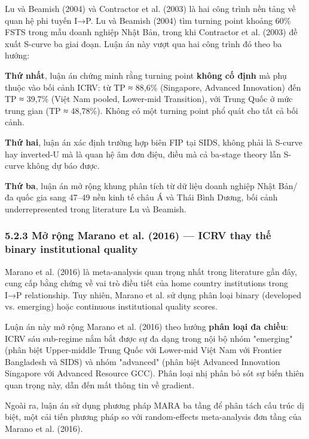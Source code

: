 \documentclass[12pt,a4paper]{article}
\begin{document}
Lu và Beamish (2004) và Contractor et al. (2003) là hai công trình nền
tảng về quan hệ phi tuyến I→P. Lu và Beamish (2004) tìm turning point
khoảng 60\% FSTS trong mẫu doanh nghiệp Nhật Bản, trong khi Contractor
et al. (2003) đề xuất S-curve ba giai đoạn. Luận án này vượt qua hai
công trình đó theo ba hướng:

\textbf{Thứ nhất}, luận án chứng minh rằng turning point \textbf{không
cố định} mà phụ thuộc vào bối cảnh ICRV: từ TP ≈ 88,6\% (Singapore,
Advanced Innovation) đến TP ≈ 39,7\% (Việt Nam pooled, Lower-mid
Transition), với Trung Quốc ở mức trung gian (TP ≈ 48,78\%). Không có
một turning point phổ quát cho tất cả bối cảnh.

\textbf{Thứ hai}, luận án xác định trường hợp biên FIP tại SIDS, không
phải là S-curve hay inverted-U mà là quan hệ âm đơn điệu, điều mà cả
ba-stage theory lẫn S-curve không dự báo được.

\textbf{Thứ ba}, luận án mở rộng khung phân tích từ dữ liệu doanh nghiệp
Nhật Bản/đa quốc gia sang 47--49 nền kinh tế châu Á và Thái Bình Dương,
bối cảnh underrepresented trong literature Lu và Beamish.

\hypertarget{523-mux1edf-rux1ed9ng-marano-et-al-2016--icrv-thay-thux1ebf-binary-institutional-quality}{%
\subsubsection{5.2.3 Mở rộng Marano et al. (2016) --- ICRV thay thế
binary institutional
quality}\label{523-mux1edf-rux1ed9ng-marano-et-al-2016--icrv-thay-thux1ebf-binary-institutional-quality}}

Marano et al. (2016) là meta-analysis quan trọng nhất trong literature
gần đây, cung cấp bằng chứng về vai trò điều tiết của home country
institutions trong I→P relationship. Tuy nhiên, Marano et al. sử dụng
phân loại binary (developed vs. emerging) hoặc continuous institutional
quality scores.

Luận án này mở rộng Marano et al. (2016) theo hướng \textbf{phân loại đa
chiều}: ICRV sáu sub-regime nắm bắt được sự đa dạng trong nội bộ nhóm
"emerging" (phân biệt Upper-middle Trung Quốc với Lower-mid Việt Nam với
Frontier Bangladesh và SIDS) và nhóm "advanced" (phân biệt Advanced
Innovation Singapore với Advanced Resource GCC). Phân loại nhị phân bỏ
sót sự biến thiên quan trọng này, dẫn đến mất thông tin về gradient.

Ngoài ra, luận án sử dụng phương pháp MARA ba tầng để phân tách cấu trúc
dị biệt, một cải tiến phương pháp so với random-effects meta-analysis
đơn tầng của Marano et al. (2016).
\end{document}
